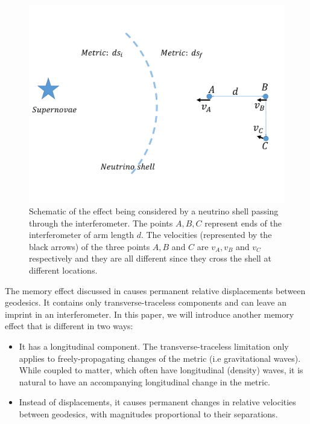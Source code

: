 \documentclass[aps,showpacs,twocolumn,floats,prd,superscriptaddress,nofootinbib]{revtex4-1}
\begin{document}
\begin{figure}[b]
\begin{center}
\includegraphics[scale = 0.27]{intro.pdf}
\caption{Schematic of the effect being considered by a neutrino shell passing through the interferometer. The points $A,B,C$ represent ends of the interferometer of arm length $d$. The velocities (represented by the black arrows) of the three points $A,B$ and $C$ are $v_A, v_B$ and $v_C$ respectively and they are all different since they cross the shell at different locations.}
\label{fig:1}
\end{center}
\end{figure}

The memory effect discussed in \cite{Christodoulou_effect,GW_memory} causes permanent relative displacements between geodesics. It contains only transverse-traceless components and can leave an imprint in an interferometer. In this paper, we will introduce another memory effect that is different in two ways:
\begin{itemize}
\item It has a longitudinal component. The transverse-traceless limitation only applies to freely-propagating changes of the metric (i.e gravitational waves). While coupled to matter, which often have longitudinal (density) waves, it is natural to have an accompanying longitudinal change in the metric.
\item Instead of displacements, it causes permanent changes in relative velocities between geodesics, with magnitudes proportional to their separations.
\end{itemize}
\end{document}

